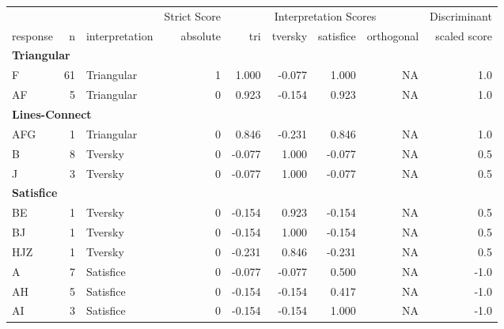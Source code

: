 \documentclass[
  letterpaper,
  DIV=11,
  numbers=noendperiod]{scrreprt}
\begin{document}
\begin{tabular}[t]{l|r|l|r|r|r|r|r|r}
\hline
\multicolumn{3}{c|}{ } & \multicolumn{1}{c|}{Strict Score} & \multicolumn{4}{c|}{Interpretation Scores} & \multicolumn{1}{c}{Discriminant} \\
\cline{4-4} \cline{5-8} \cline{9-9}
response & n & interpretation & absolute & tri & tversky & satisfice & orthogonal & scaled score\\
\hline
\multicolumn{9}{l}{\textbf{Triangular}}\\
\hline
\hspace{1em}F & 61 & Triangular & 1 & 1.000 & -0.077 & 1.000 & NA & 1.0\\
\hline
\hspace{1em}AF & 5 & Triangular & 0 & 0.923 & -0.154 & 0.923 & NA & 1.0\\
\hline
\multicolumn{9}{l}{\textbf{Lines-Connect}}\\
\hline
\hspace{1em}\hspace{1em}AFG & 1 & Triangular & 0 & 0.846 & -0.231 & 0.846 & NA & 1.0\\
\hline
\hspace{1em}\hspace{1em}B & 8 & Tversky & 0 & -0.077 & 1.000 & -0.077 & NA & 0.5\\
\hline
\hspace{1em}\hspace{1em}J & 3 & Tversky & 0 & -0.077 & 1.000 & -0.077 & NA & 0.5\\
\hline
\multicolumn{9}{l}{\textbf{Satisfice}}\\
\hline
\hspace{1em}BE & 1 & Tversky & 0 & -0.154 & 0.923 & -0.154 & NA & 0.5\\
\hline
\hspace{1em}BJ & 1 & Tversky & 0 & -0.154 & 1.000 & -0.154 & NA & 0.5\\
\hline
\hspace{1em}HJZ & 1 & Tversky & 0 & -0.231 & 0.846 & -0.231 & NA & 0.5\\
\hline
\hspace{1em}A & 7 & Satisfice & 0 & -0.077 & -0.077 & 0.500 & NA & -1.0\\
\hline
\hspace{1em}AH & 5 & Satisfice & 0 & -0.154 & -0.154 & 0.417 & NA & -1.0\\
\hline
\hspace{1em}AI & 3 & Satisfice & 0 & -0.154 & -0.154 & 1.000 & NA & -1.0\\

\end{tabular}
\end{document}
